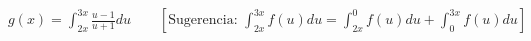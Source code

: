 \item $\displaystyle g(x) = \int_{2x}^{3x} \frac{u - 1}{u + 1} du \qquad \left[ \text{Sugerencia: } \int_{2x}^{3x} f(u) du = \int_{2x}^0 f(u) du + \int_0^{3x} f(u) du \right]$
